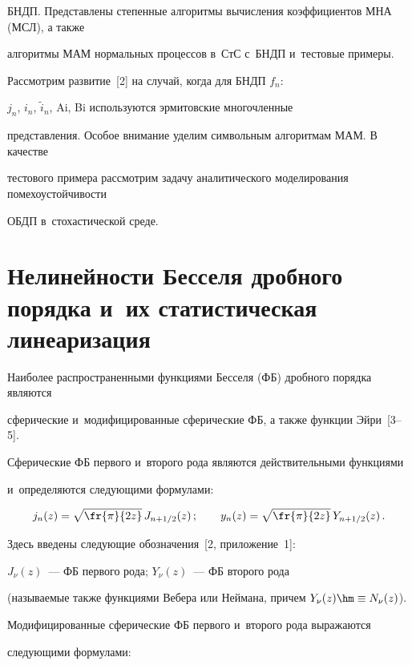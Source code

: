 БНДП. Представлены степенные алгоритмы вычисления коэффициентов МНА (МСЛ), а также 

алгоритмы МАМ нормальных процессов в~СтС с~БНДП и~тестовые примеры.



Рассмотрим развитие~[2] на случай, когда для БНДП $f_n$: 

$j_n$, $i_n$, $\tilde i_n$, Ai, Bi используются эрмитовские многочленные 

представления. Особое внимание уделим символьным алгоритмам МАМ. В качестве 

тестового примера рассмотрим задачу аналитического моделирования помехоустойчивости 

ОБДП в~стохастической среде.



\section{Нелинейности Бесселя дробного порядка и~их статистическая линеаризация}



Наиболее распространенными функциями Бесселя (ФБ) дробного порядка являются 

сферические и~модифицированные сферические ФБ, а также функции Эйри~[3--5].



Сферические ФБ первого и~второго рода являются действительными функциями 

и~определяются следующими формулами:

\begin{equation*}

j_n (z) = \sqrt{\fr{\pi}{2z}}\, J_{n+1/2} (z)\,;\qquad %

y_n (z) = \sqrt{\fr{\pi}{2z}}\, Y_{n+1/2} (z)\,. %

\end{equation*}

Здесь введены следующие обозначения~[2, приложение~1]: 

$J_\nu (z)$~--- ФБ первого рода;  $Y_\nu (z)$~--- ФБ второго рода 

(называемые также функциями Вебера или Неймана, причем $Y_\nu (z) \hm\equiv N_\nu (z)$).



Модифицированные сферические ФБ первого и~второго рода выражаются 

следующими формулами:

